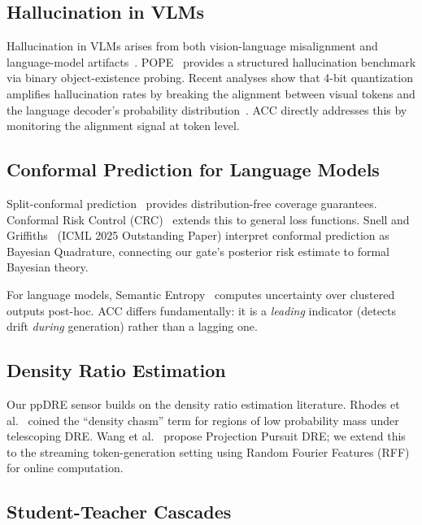 \documentclass[runningheads]{llncs}
\begin{document}
\subsection{Hallucination in VLMs}

Hallucination in VLMs arises from both vision-language misalignment and
language-model artifacts~\cite{huang2024hallucination}.
POPE~\cite{li2023pope} provides a structured hallucination benchmark via
binary object-existence probing. Recent analyses show that 4-bit quantization
amplifies hallucination rates by breaking the alignment between visual tokens
and the language decoder's probability distribution~\cite{huang2024hallucination}.
ACC directly addresses this by monitoring the alignment signal at token level.

\subsection{Conformal Prediction for Language Models}

Split-conformal prediction~\cite{angelopoulos2022conformal} provides
distribution-free coverage guarantees. Conformal Risk Control
(CRC)~\cite{angelopoulos2024crc} extends this to general loss functions.
Snell and Griffiths~\cite{snell2025conformal} (ICML 2025 Outstanding Paper)
interpret conformal prediction as Bayesian Quadrature, connecting our gate's
posterior risk estimate to formal Bayesian theory.

For language models, Semantic Entropy~\cite{kuhn2023semantic} computes
uncertainty over clustered outputs post-hoc. ACC differs fundamentally:
it is a \emph{leading} indicator (detects drift \emph{during} generation)
rather than a lagging one.

\subsection{Density Ratio Estimation}

Our ppDRE sensor builds on the density ratio estimation literature.
Rhodes et al.~\cite{rhodes2020telescoping} coined the ``density chasm''
term for regions of low probability mass under telescoping DRE.
Wang et al.~\cite{wang2025ppdre} propose Projection Pursuit DRE;
we extend this to the streaming token-generation setting using Random
Fourier Features (RFF)~\cite{liao2020random} for online computation.

\subsection{Student-Teacher Cascades}
\end{document}
